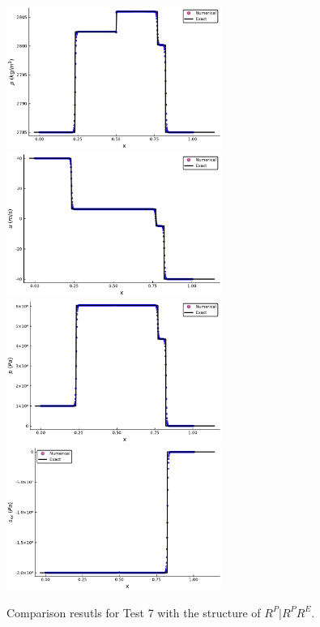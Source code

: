 \documentclass[review]{elsarticle}
\numberwithin{equation}{section}
\numberwithin{table}{section}
\begin{document}
\begin{figure}[ht]
  \centering

  \includegraphics[width= 7cm] {case5rho.pdf}
  \includegraphics[width= 7cm] {case5u.pdf}
  \includegraphics[width= 7cm] {case5p.pdf}
  \includegraphics[width= 7cm] {case5sxx.pdf}

    \caption{Comparison resutls for Test 7 with the structure of $R^P|R^PR^E$.  }
  \label{fig:case5}
\end{figure}
\end{document}
